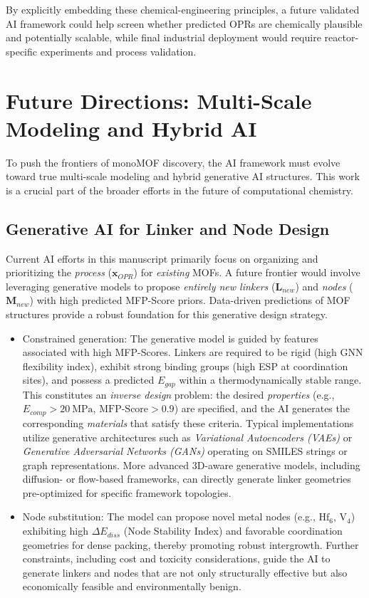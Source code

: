 \documentclass[12pt,a4paper]{article}
\begin{document}
By explicitly embedding these chemical-engineering principles, a future validated AI framework could help screen whether predicted OPRs are chemically plausible and potentially scalable, while final industrial deployment would require reactor-specific experiments and process validation.


\section{Future Directions: Multi-Scale Modeling and Hybrid AI}

To push the frontiers of monoMOF discovery, the AI framework must evolve toward true multi-scale modeling and hybrid generative AI structures. This work is a crucial part of the broader efforts in the future of computational chemistry.\cite{ref46}

\subsection{Generative AI for Linker and Node Design}

Current AI efforts in this manuscript primarily focus on organizing and prioritizing the \textit{process} ($\mathbf{x}_{OPR}$) for \textit{existing} MOFs. A future frontier would involve leveraging generative models to propose \textit{entirely new linkers} ($\mathbf{L}_{new}$) and \textit{nodes} ($\mathbf{M}_{new}$) with high predicted MFP-Score priors. Data-driven predictions of MOF structures provide a robust foundation for this generative design strategy.\cite{ref47}

\begin{itemize}
    \item Constrained generation: The generative model is guided by features associated with high MFP-Scores. Linkers are required to be rigid (high GNN flexibility index), exhibit strong binding groups (high ESP at coordination sites), and possess a predicted $E_{gap}$ within a thermodynamically stable range. This constitutes an \textit{inverse design} problem: the desired \textit{properties} (e.g., $E_{comp} > 20~\text{MPa}$, $\text{MFP-Score} > 0.9$) are specified, and the AI generates the corresponding \textit{materials} that satisfy these criteria.\cite{ref48,ref49} Typical implementations utilize generative architectures such as \textit{Variational Autoencoders (VAEs)} or \textit{Generative Adversarial Networks (GANs)} operating on SMILES strings or graph representations. More advanced 3D-aware generative models, including diffusion- or flow-based frameworks, can directly generate linker geometries pre-optimized for specific framework topologies.\cite{ref54}
    \item Node substitution: The model can propose novel metal nodes (e.g., $\text{Hf}_6$, $\text{V}_4$) exhibiting high $\Delta E_{diss}$ (Node Stability Index) and favorable coordination geometries for dense packing, thereby promoting robust intergrowth. Further constraints, including cost and toxicity considerations, guide the AI to generate linkers and nodes that are not only structurally effective but also economically feasible and environmentally benign.
\end{itemize}
\end{document}
